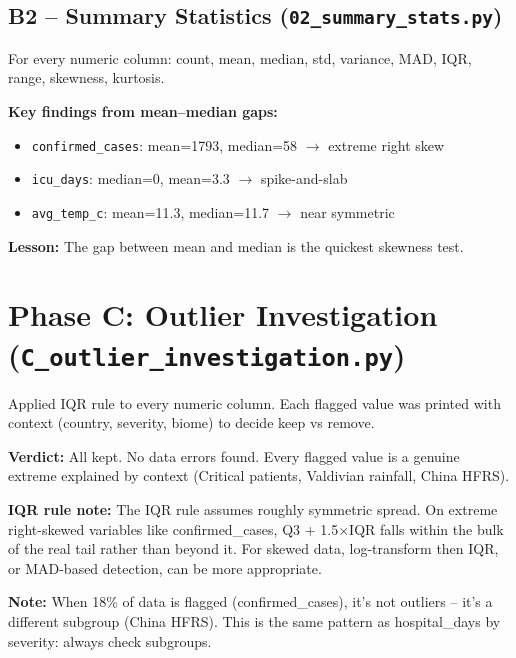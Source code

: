 \documentclass[11pt,a4paper]{article}
\begin{document}
\subsection{B2 -- Summary Statistics (\texttt{02\_summary\_stats.py})}

For every numeric column: count, mean, median, std, variance, MAD, IQR, range, skewness, kurtosis.

\textbf{Key findings from mean--median gaps:}
\begin{itemize}
\item \texttt{confirmed\_cases}: mean=1793, median=58 $\rightarrow$ extreme right skew
\item \texttt{icu\_days}: median=0, mean=3.3 $\rightarrow$ spike-and-slab
\item \texttt{avg\_temp\_c}: mean=11.3, median=11.7 $\rightarrow$ near symmetric
\end{itemize}

\textbf{Lesson:} The gap between mean and median is the quickest skewness test.

\newpage

\section{Phase C: Outlier Investigation (\texttt{C\_outlier\_investigation.py})}

Applied IQR rule to every numeric column. Each flagged value was printed with context
(country, severity, biome) to decide keep vs remove.

\begin{table}[htbp]
\centering
\resizebox{\textwidth}{!}{

}
\end{table}

\textbf{Verdict:} All kept. No data errors found. Every flagged value is a genuine
extreme explained by context (Critical patients, Valdivian rainfall, China HFRS).

\textbf{IQR rule note:} The IQR rule assumes roughly symmetric spread. On extreme right-skewed
variables like confirmed\_cases, Q3 + 1.5$\times$IQR falls within the bulk of the real tail
rather than beyond it. For skewed data, log-transform then IQR, or MAD-based detection,
can be more appropriate.

\textbf{Note:} When 18\% of data is flagged (confirmed\_cases), it's not outliers --
it's a different subgroup (China HFRS). This is the same pattern as hospital\_days
by severity: always check subgroups.
\end{document}
